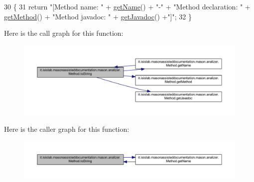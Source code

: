 \begin{DoxyCode}
30                             \{
31         \textcolor{keywordflow}{return} \textcolor{stringliteral}{"[Method name: "} + \hyperlink{classit_1_1isislab_1_1masonassisteddocumentation_1_1mason_1_1analizer_1_1_method_a87c28d457164a753322c0849ba2bc981}{getName}() + \textcolor{stringliteral}{"-"} + \textcolor{stringliteral}{"Method declaration: "} + 
      \hyperlink{classit_1_1isislab_1_1masonassisteddocumentation_1_1mason_1_1analizer_1_1_method_a8d2f7bfdb9e487a2564d8ebe46bc946e}{getMethod}() + \textcolor{stringliteral}{"Method javadoc: "} + \hyperlink{classit_1_1isislab_1_1masonassisteddocumentation_1_1mason_1_1analizer_1_1_method_a04c17c96931db2403fb5a5eca7d3837b}{getJavadoc}() +\textcolor{stringliteral}{"]"};
32     \}
\end{DoxyCode}


Here is the call graph for this function\-:
\nopagebreak
\begin{figure}[H]
\begin{center}
\leavevmode
\includegraphics[width=350pt]{classit_1_1isislab_1_1masonassisteddocumentation_1_1mason_1_1analizer_1_1_method_ae68759230dfc5543fd98bfaba0c4d4a9_cgraph}
\end{center}
\end{figure}




Here is the caller graph for this function\-:
\nopagebreak
\begin{figure}[H]
\begin{center}
\leavevmode
\includegraphics[width=350pt]{classit_1_1isislab_1_1masonassisteddocumentation_1_1mason_1_1analizer_1_1_method_ae68759230dfc5543fd98bfaba0c4d4a9_icgraph}
\end{center}
\end{figure}




